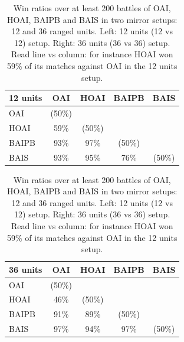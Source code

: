 \begin{table}[h]
\begin{center}
\begin{tabular}{|l|c|c|c|c|}
\hline
12 units & OAI & HOAI & BAIPB & BAIS \\
\hline
OAI & (50\%) & & & \\
HOAI & 59\% & (50\%) & & \\
BAIPB & 93\% & 97\% & (50\%) & \\
BAIS & 93\% & 95\% & 76\% & (50\%)\\
\hline
\end{tabular}
\begin{tabular}{|l|c|c|c|c|}
\hline
36 units & OAI & HOAI & BAIPB & BAIS \\
\hline
OAI & (50\%) & & & \\
HOAI & 46\% & (50\%) & & \\
BAIPB & 91\% & 89\% & (50\%) & \\
BAIS & 97\% & 94\% & 97\% & (50\%)\\
\hline
\end{tabular}
\end{center}
\caption{Win ratios over at least 200 battles of OAI, HOAI, BAIPB and BAIS in two mirror setups: 12 and 36 ranged units. Left: 12 units (12 vs 12) setup. Right: 36 units (36 vs 36) setup. Read line vs column: for instance HOAI won 59\% of its matches against OAI in the 12 units setup.} %
\label{tab:win_ratios}
\end{table}

